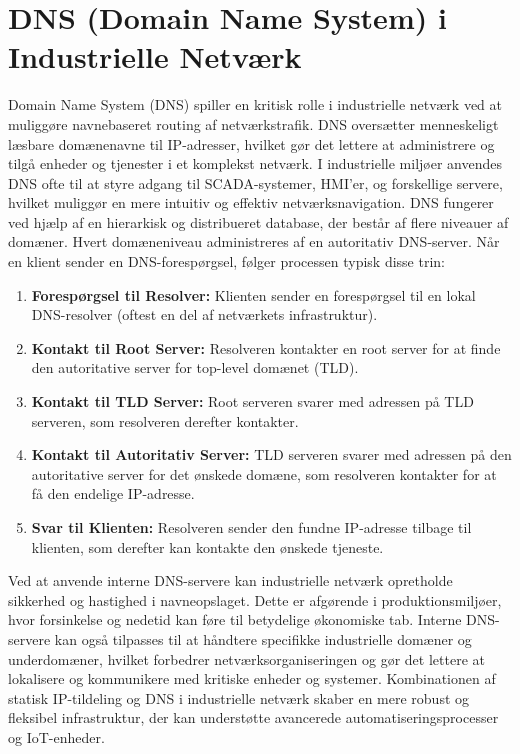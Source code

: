 \section{DNS (Domain Name System) i Industrielle Netværk}
Domain Name System (DNS) spiller en kritisk rolle i industrielle netværk ved at muliggøre navnebaseret routing af netværkstrafik. DNS oversætter menneskeligt læsbare domænenavne til IP-adresser, hvilket gør det lettere at administrere og tilgå enheder og tjenester i et komplekst netværk. I industrielle miljøer anvendes DNS ofte til at styre adgang til SCADA-systemer, HMI'er, og forskellige servere, hvilket muliggør en mere intuitiv og effektiv netværksnavigation.
\newline
\newline
\noindent DNS fungerer ved hjælp af en hierarkisk og distribueret database, der består af flere niveauer af domæner. Hvert domæneniveau administreres af en autoritativ DNS-server. Når en klient sender en DNS-forespørgsel, følger processen typisk disse trin:
\begin{enumerate}
	\item \textbf{Forespørgsel til Resolver:} Klienten sender en forespørgsel til en lokal DNS-resolver (oftest en del af netværkets infrastruktur).
	\item \textbf{Kontakt til Root Server:} Resolveren kontakter en root server for at finde den autoritative server for top-level domænet (TLD).
	\item \textbf{Kontakt til TLD Server:} Root serveren svarer med adressen på TLD serveren, som resolveren derefter kontakter.
	\item \textbf{Kontakt til Autoritativ Server:} TLD serveren svarer med adressen på den autoritative server for det ønskede domæne, som resolveren kontakter for at få den endelige IP-adresse.
	\item \textbf{Svar til Klienten:} Resolveren sender den fundne IP-adresse tilbage til klienten, som derefter kan kontakte den ønskede tjeneste.
\end{enumerate}
\noindent Ved at anvende interne DNS-servere kan industrielle netværk opretholde sikkerhed og hastighed i navneopslaget. Dette er afgørende i produktionsmiljøer, hvor forsinkelse og nedetid kan føre til betydelige økonomiske tab. Interne DNS-servere kan også tilpasses til at håndtere specifikke industrielle domæner og underdomæner, hvilket forbedrer netværksorganiseringen og gør det lettere at lokalisere og kommunikere med kritiske enheder og systemer. Kombinationen af statisk IP-tildeling og DNS i industrielle netværk skaber en mere robust og fleksibel infrastruktur, der kan understøtte avancerede automatiseringsprocesser og IoT-enheder.

